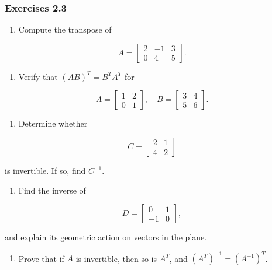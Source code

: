 \documentclass[
  12pt,
  a4paper,
]{article}
\begin{document}
\subsubsection{Exercises 2.3}\label{exercises-23}

\begin{enumerate}
\def\labelenumi{\arabic{enumi}.}
\item
  Compute the transpose of
\end{enumerate}

\[A = \begin{bmatrix} 2 & -1 & 3 \\ 0 & 4 & 5 \end{bmatrix}.\]

\begin{enumerate}
\def\labelenumi{\arabic{enumi}.}
\item
  Verify that \((AB)^T = B^T A^T\) for
\end{enumerate}

\[A = \begin{bmatrix} 1 & 2 \\ 0 & 1 \end{bmatrix}, \quad
B = \begin{bmatrix} 3 & 4 \\ 5 & 6 \end{bmatrix}.\]

\begin{enumerate}
\def\labelenumi{\arabic{enumi}.}
\item
  Determine whether
\end{enumerate}

\[C = \begin{bmatrix} 2 & 1 \\ 4 & 2 \end{bmatrix}\]

is invertible. If so, find \(C^{-1}\).

\begin{enumerate}
\def\labelenumi{\arabic{enumi}.}
\item
  Find the inverse of
\end{enumerate}

\[D = \begin{bmatrix} 0 & 1 \\ -1 & 0 \end{bmatrix},\]

and explain its geometric action on vectors in the plane.

\begin{enumerate}
\def\labelenumi{\arabic{enumi}.}
\item
  Prove that if \(A\) is invertible, then so is \(A^T\), and
  \((A^T)^{-1} = (A^{-1})^T\).
\end{enumerate}
\end{document}

